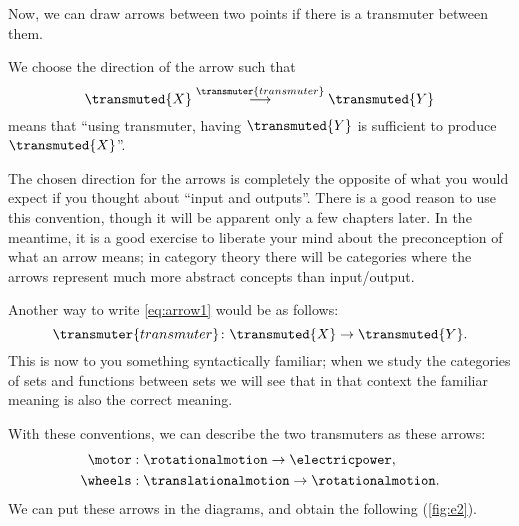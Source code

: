 Now, we can draw arrows between two points if there is a transmuter between them.

We choose the direction of the arrow such that
\begin{equation}
    \label{eq:arrow1}
    \transmuted{X} \stackrel{\transmuter{transmuter}}{\longrightarrow} \transmuted{Y}
\end{equation}
means that ``using \textsf{transmuter}, having $\transmuted{Y}$ is sufficient to produce $\transmuted{X}$''.

\begin{remark}
    The chosen direction
    for the arrows is completely the opposite of what you would expect if you thought about
    ``input and outputs''. There is a good reason to use this convention, though it will
    be apparent only a few chapters later. In the meantime, it is a good exercise
    to liberate your mind about the preconception of what an arrow means; in category theory
    there will be categories where the arrows represent much more abstract concepts than input/output.
\end{remark}

Another way to write \cref{eq:arrow1} would be as follows:
\begin{equation}
    \transmuter{transmuter} \colon \transmuted{X} \to \transmuted{Y}.
\end{equation}
This is now to you something syntactically familiar; when we study the categories of sets and functions between sets we will see that in that context the familiar meaning is also the correct meaning.

With these conventions, we can describe the two transmuters as these arrows:
%
\begin{align}
    \motor&:  \rotationalmotion \rightarrow \electricpower, \\
    \wheels&: \translationalmotion \rightarrow \rotationalmotion.
\end{align}
%
We can put these arrows in the diagrams, and obtain
the following (\cref{fig:e2}).





